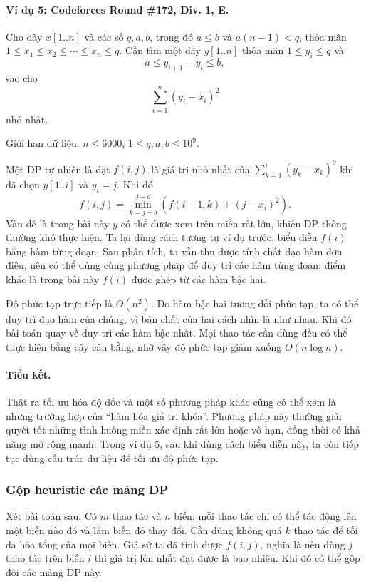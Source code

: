 \documentclass[11pt]{article}
\begin{document}
\paragraph{Ví dụ 5: Codeforces Round \#172, Div. 1, E.}
Cho dãy \(x[1..n]\) và các số \(q,a,b\), trong đó \(a\le b\) và
\(a(n-1)<q\), thỏa mãn \(1\le x_1\le x_2\le \cdots\le x_n\le q\). Cần tìm một
dãy \(y[1..n]\) thỏa mãn \(1\le y_i\le q\) và
\[
  a\le y_{i+1}-y_i\le b,
\]
sao cho
\[
  \sum_{i=1}^{n}(y_i-x_i)^2
\]
nhỏ nhất.

Giới hạn dữ liệu: \(n\le 6000\), \(1\le q,a,b\le 10^9\).

Một DP tự nhiên là đặt \(f(i,j)\) là giá trị nhỏ nhất của
\(\sum_{k=1}^{i}(y_k-x_k)^2\) khi đã chọn \(y[1..i]\) và \(y_i=j\). Khi đó
\[
  f(i,j)=\min_{k=j-b}^{j-a}\left(f(i-1,k)+(j-x_i)^2\right).
\]
Vấn đề là trong bài này \(y\) có thể được xem trên miền rất lớn, khiến DP thông
thường khó thực hiện. Ta lại dùng cách tương tự ví dụ trước, biểu diễn \(f(i)\)
bằng hàm từng đoạn. Sau phân tích, ta vẫn thu được tính chất đạo hàm đơn điệu,
nên có thể dùng cùng phương pháp để duy trì các hàm từng đoạn; điểm khác là
trong bài này \(f(i)\) được ghép từ các hàm bậc hai.

Độ phức tạp trực tiếp là \(O(n^2)\). Do hàm bậc hai tương đối phức tạp, ta có
thể duy trì đạo hàm của chúng, vì bản chất của hai cách nhìn là như nhau. Khi
đó bài toán quay về duy trì các hàm bậc nhất. Mọi thao tác cần dùng đều có thể
thực hiện bằng cây cân bằng, nhờ vậy độ phức tạp giảm xuống \(O(n\log n)\).

\paragraph{Tiểu kết.}
Thật ra tối ưu hóa độ dốc và một số phương pháp khác cũng có thể xem là những
trường hợp của ``hàm hóa giá trị khóa''. Phương pháp này thường giải quyết tốt
những tình huống miền xác định rất lớn hoặc vô hạn, đồng thời có khả năng mở
rộng mạnh. Trong ví dụ 5, sau khi dùng cách biểu diễn này, ta còn tiếp tục dùng
cấu trúc dữ liệu để tối ưu độ phức tạp.

\subsubsection{Gộp heuristic các mảng DP}

Xét bài toán sau. Có \(m\) thao tác và \(n\) biến; mỗi thao tác chỉ có thể tác
động lên một biến nào đó và làm biến đó thay đổi. Cần dùng không quá \(k\) thao
tác để tối đa hóa tổng của mọi biến. Giả sử ta đã tính được \(f(i,j)\), nghĩa là
nếu dùng \(j\) thao tác trên biến \(i\) thì giá trị lớn nhất đạt được là bao
nhiêu. Khi đó có thể gộp đôi các mảng DP này.
\end{document}
